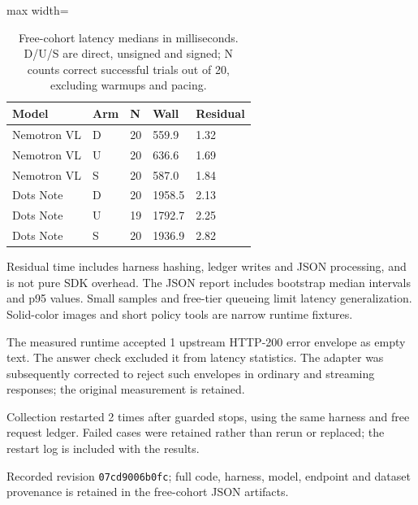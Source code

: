 \begin{table}[t]
\centering
\caption{Free-cohort latency medians in milliseconds. D/U/S are direct, unsigned and signed; N counts correct successful trials out of 20, excluding warmups and pacing.}
\label{tab:free-latency}
\begingroup\small\setlength{\tabcolsep}{3pt}
\begin{adjustbox}{max width=\linewidth}
\begin{tabular}{lllll}
\hline
Model & Arm & N & Wall & Residual \\
\hline
Nemotron VL & D & 20 & 559.9 & 1.32 \\
Nemotron VL & U & 20 & 636.6 & 1.69 \\
Nemotron VL & S & 20 & 587.0 & 1.84 \\
Dots Note & D & 20 & 1958.5 & 2.13 \\
Dots Note & U & 19 & 1792.7 & 2.25 \\
Dots Note & S & 20 & 1936.9 & 2.82 \\
\hline
\end{tabular}
\end{adjustbox}\endgroup
\end{table}

Residual time includes harness hashing, ledger writes and JSON processing, and is not pure SDK overhead. The JSON report includes bootstrap median intervals and p95 values. Small samples and free-tier queueing limit latency generalization. Solid-color images and short policy tools are narrow runtime fixtures.

The measured runtime accepted 1 upstream HTTP-200 error envelope as empty text. The answer check excluded it from latency statistics. The adapter was subsequently corrected to reject such envelopes in ordinary and streaming responses; the original measurement is retained.

Collection restarted 2 times after guarded stops, using the same harness and free request ledger. Failed cases were retained rather than rerun or replaced; the restart log is included with the results.

Recorded revision \texttt{07cd9006b0fc}; full code, harness, model, endpoint and dataset provenance is retained in the free-cohort JSON artifacts.

\FloatBarrier
